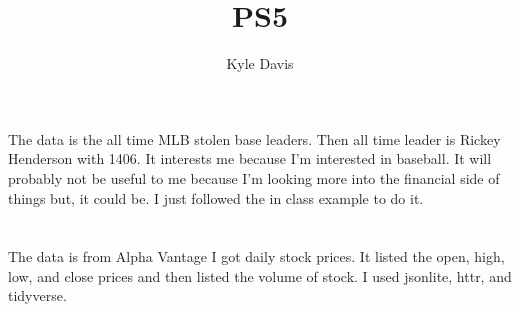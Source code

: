 \documentclass{article}
\title{PS5}
\author{Kyle Davis}
\begin{document}
\maketitle



\section{}

The data is the all time MLB stolen base leaders. Then all time leader is Rickey Henderson with 1406. It interests me because I'm interested in baseball. It will probably not be useful to me because I'm looking more into the financial side of things but, it could be. I just followed the in class example to do it. 

\section{}
The data is from Alpha Vantage I got daily stock prices. It listed the open, high, low, and close prices and then listed the volume of stock. I used jsonlite, httr, and tidyverse. 
\end{document}
